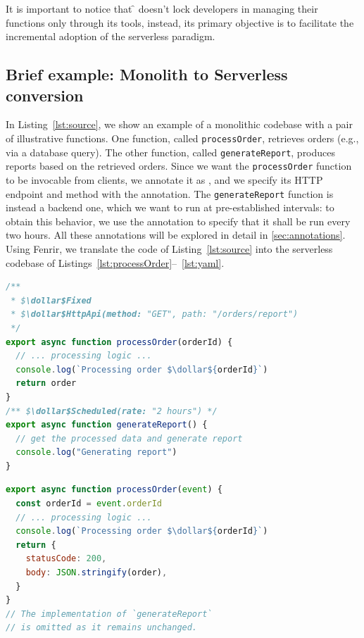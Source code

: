 It is important to notice that \f{} doesn't lock developers in managing their
functions only through its tools, instead, its primary objective is to facilitate
the incremental adoption of the serverless paradigm.

\subsection{Brief example: Monolith to Serverless conversion}

In Listing~\ref{lst:source}, we show an example of a monolithic codebase with a
pair of illustrative functions. One function, called \verb|processOrder|,
retrieves orders (e.g., via a database query). The other function, called
\verb|generateReport|, produces reports based on the retrieved orders. Since
we want the \verb|processOrder| function to be invocable from clients, we
annotate it as , and we specify its HTTP endpoint and method
with the  annotation. The \verb|generateReport| function
is instead a backend one, which we want to run at pre-established intervals: to
obtain this behavior, we use the  annotation to specify
that it shall be run every two hours.
All these annotations will be explored in detail in \autoref{sec:annotations}.
Using Fenrir, we translate the code of Listing~\ref{lst:source} into the
serverless codebase of Listings~\ref{lst:processOrder}--~\ref{lst:yaml}.

\begin{lstlisting}[language=javascript, caption={Source Code.}, label=lst:source]
/**
 * $\dollar$Fixed
 * $\dollar$HttpApi(method: "GET", path: "/orders/report")
 */
export async function processOrder(orderId) {
  // ... processing logic ...
  console.log(`Processing order $\dollar${orderId}`)
  return order
}
/** $\dollar$Scheduled(rate: "2 hours") */
export async function generateReport() {
  // get the processed data and generate report
  console.log("Generating report")
}
\end{lstlisting}

\begin{lstlisting}[language=javascript, caption={Generated Code.}, label=lst:processOrder]
export async function processOrder(event) {
  const orderId = event.orderId
  // ... processing logic ...
  console.log(`Processing order $\dollar${orderId}`)
  return {
    statusCode: 200,
    body: JSON.stringify(order),
  }
}
// The implementation of `generateReport`
// is omitted as it remains unchanged.
\end{lstlisting}

